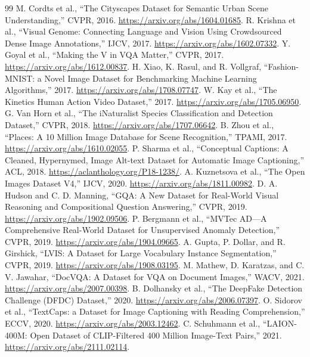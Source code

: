 ﻿\documentclass[11pt,a4paper]{article}
\begin{document}
\begin{thebibliography}{99}
 M. Cordts et al., ``The Cityscapes Dataset for Semantic Urban Scene Understanding,'' CVPR, 2016. \url{https://arxiv.org/abs/1604.01685}.
 R. Krishna et al., ``Visual Genome: Connecting Language and Vision Using Crowdsourced Dense Image Annotations,'' IJCV, 2017. \url{https://arxiv.org/abs/1602.07332}.
 Y. Goyal et al., ``Making the V in VQA Matter,'' CVPR, 2017. \url{https://arxiv.org/abs/1612.00837}.
 H. Xiao, K. Rasul, and R. Vollgraf, ``Fashion-MNIST: a Novel Image Dataset for Benchmarking Machine Learning Algorithms,'' 2017. \url{https://arxiv.org/abs/1708.07747}.
 W. Kay et al., ``The Kinetics Human Action Video Dataset,'' 2017. \url{https://arxiv.org/abs/1705.06950}.
 G. Van Horn et al., ``The iNaturalist Species Classification and Detection Dataset,'' CVPR, 2018. \url{https://arxiv.org/abs/1707.06642}.
 B. Zhou et al., ``Places: A 10 Million Image Database for Scene Recognition,'' TPAMI, 2017. \url{https://arxiv.org/abs/1610.02055}.
 P. Sharma et al., ``Conceptual Captions: A Cleaned, Hypernymed, Image Alt-text Dataset for Automatic Image Captioning,'' ACL, 2018. \url{https://aclanthology.org/P18-1238/}.
 A. Kuznetsova et al., ``The Open Images Dataset V4,'' IJCV, 2020. \url{https://arxiv.org/abs/1811.00982}.
 D. A. Hudson and C. D. Manning, ``GQA: A New Dataset for Real-World Visual Reasoning and Compositional Question Answering,'' CVPR, 2019. \url{https://arxiv.org/abs/1902.09506}.
 P. Bergmann et al., ``MVTec AD---A Comprehensive Real-World Dataset for Unsupervised Anomaly Detection,'' CVPR, 2019. \url{https://arxiv.org/abs/1904.09665}.
 A. Gupta, P. Dollar, and R. Girshick, ``LVIS: A Dataset for Large Vocabulary Instance Segmentation,'' CVPR, 2019. \url{https://arxiv.org/abs/1908.03195}.
 M. Mathew, D. Karatzas, and C. V. Jawahar, ``DocVQA: A Dataset for VQA on Document Images,'' WACV, 2021. \url{https://arxiv.org/abs/2007.00398}.
 B. Dolhansky et al., ``The DeepFake Detection Challenge (DFDC) Dataset,'' 2020. \url{https://arxiv.org/abs/2006.07397}.
 O. Sidorov et al., ``TextCaps: a Dataset for Image Captioning with Reading Comprehension,'' ECCV, 2020. \url{https://arxiv.org/abs/2003.12462}.
 C. Schuhmann et al., ``LAION-400M: Open Dataset of CLIP-Filtered 400 Million Image-Text Pairs,'' 2021. \url{https://arxiv.org/abs/2111.02114}.

\end{thebibliography}
\end{document}

